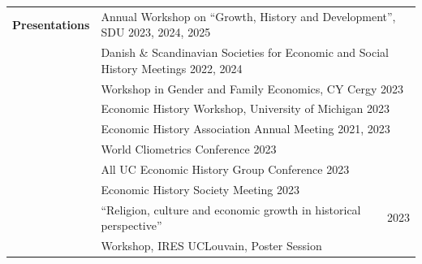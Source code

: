 \documentclass[a4paper,11pt,oneside]{article}
\begin{document}
\begin{longtable}{@{} p{0.175\linewidth} p{0.775\linewidth} p{0.05\linewidth}}
   
   
   
   \textbf{\large{Presentations}}    & \multicolumn{2}{l}{Annual Workshop on ``Growth, History and Development'', SDU  \hfill 2023, 2024, 2025} \\  
   &  \multicolumn{2}{l}{ Danish  \& Scandinavian Societies for Economic and Social History Meetings   \hfill 2022, 2024} \\
   & \multicolumn{2}{l}{Workshop in Gender and Family Economics, CY Cergy  \hfill 2023}\\
     & \multicolumn{2}{l}{Economic History Workshop, University of Michigan \hfill 2023}\\
   & \multicolumn{2}{l}{ Economic History Association Annual Meeting   \hfill 2021, 2023}\\
   & \multicolumn{2}{l}{ World Cliometrics Conference  \hfill 2023 } \\
   & \multicolumn{2}{l}{ All UC Economic History Group Conference  \hfill 2023}\\
   &  \multicolumn{2}{l}{ Economic History Society Meeting  \hfill 2023}\\

   & ``Religion, culture and economic growth in historical perspective'' &  \hfill 2023 \\ 
   & \hspace{4ex} Workshop, IRES UCLouvain, Poster Session \\


\end{longtable}
\end{document}
